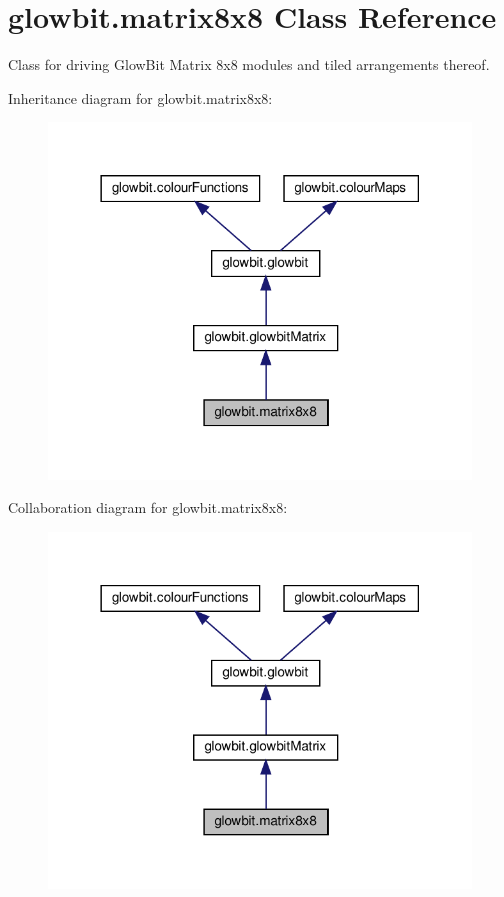 \hypertarget{classglowbit_1_1matrix8x8}{}\section{glowbit.\+matrix8x8 Class Reference}
\label{classglowbit_1_1matrix8x8}


Class for driving Glow\+Bit Matrix 8x8 modules and tiled arrangements thereof.  




Inheritance diagram for glowbit.\+matrix8x8\+:\nopagebreak
\begin{figure}[H]
\begin{center}
\leavevmode
\includegraphics[width=318pt]{classglowbit_1_1matrix8x8__inherit__graph}
\end{center}
\end{figure}


Collaboration diagram for glowbit.\+matrix8x8\+:\nopagebreak
\begin{figure}[H]
\begin{center}
\leavevmode
\includegraphics[width=318pt]{classglowbit_1_1matrix8x8__coll__graph}
\end{center}
\end{figure}

